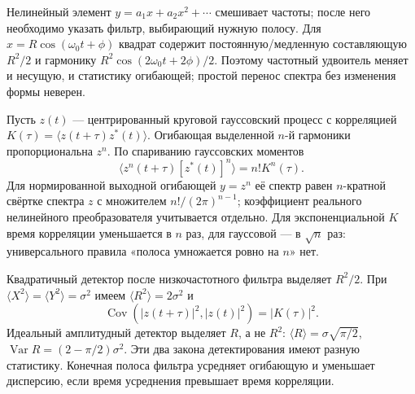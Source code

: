 
Нелинейный элемент $y=a_1x+a_2x^2+\cdots$ смешивает частоты; после него необходимо указать фильтр, выбирающий нужную полосу. Для $x=R\cos(\omega_0t+\phi)$ квадрат содержит постоянную/медленную составляющую $R^2/2$ и гармонику $R^2\cos(2\omega_0t+2\phi)/2$. Поэтому частотный удвоитель меняет и несущую, и статистику огибающей; простой перенос спектра без изменения формы неверен.

Пусть $z(t)$ — центрированный круговой гауссовский процесс с корреляцией $K(\tau)=\langle z(t+\tau)z^*(t)\rangle$. Огибающая выделенной $n$-й гармоники пропорциональна $z^n$. По спариванию гауссовских моментов
\begin{equation}
 \langle z^n(t+\tau)[z^*(t)]^n\rangle=n!K^n(\tau).
\end{equation}
Для нормированной выходной огибающей $y=z^n$ её спектр равен $n$-кратной свёртке спектра $z$ с множителем $n!/(2\pi)^{n-1}$; коэффициент реального нелинейного преобразователя учитывается отдельно. Для экспоненциальной $K$ время корреляции уменьшается в $n$ раз, для гауссовой — в $\sqrt n$ раз: универсального правила «полоса умножается ровно на $n$» нет.

Квадратичный детектор после низкочастотного фильтра выделяет $R^2/2$. При $\langle X^2\rangle=\langle Y^2\rangle=\sigma^2$ имеем $\langle R^2\rangle=2\sigma^2$ и
\begin{equation}
 \operatorname{Cov}(|z(t+\tau)|^2,|z(t)|^2)=|K(\tau)|^2.
\end{equation}
Идеальный амплитудный детектор выделяет $R$, а не $R^2$: $\langle R\rangle=\sigma\sqrt{\pi/2}$, $\operatorname{Var}R=(2-\pi/2)\sigma^2$. Эти два закона детектирования имеют разную статистику. Конечная полоса фильтра усредняет огибающую и уменьшает дисперсию, если время усреднения превышает время корреляции.
